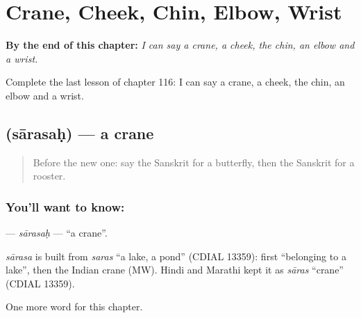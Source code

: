 
\chapter{Crane, Cheek, Chin, Elbow, Wrist}
\label{ch:sa-crane-cheek-chin-elbow-wrist}

\begin{chapteropening}
\textbf{By the end of this chapter:} \emph{I can say a crane, a cheek, the chin, an elbow and a wrist.}

Complete the last lesson of chapter 116: I can say a crane, a cheek, the chin, an elbow and a wrist.
\end{chapteropening}

\section[\texorpdfstring{\sk{सारसः} (sārasaḥ)}{सारसः (sārasaḥ)}]{ (sārasaḥ) — a crane}

\label{lesson:SA-C116-sarasah}



\begin{quote}
Before the new one: say the Sanskrit for a butterfly, then the Sanskrit for a rooster.
\end{quote}

\subsection*{You'll want to know: }
\textbf{} — \emph{sārasaḥ} — \textquotedblleft{}a crane\textquotedblright{}.

\begin{cousinweb}
\emph{sārasa} is built from \emph{saras} \textquotedblleft{}a lake, a pond\textquotedblright{} (CDIAL 13359): first \textquotedblleft{}belonging to a lake\textquotedblright{}, then the Indian crane (MW). Hindi and Marathi kept it as \emph{sāras} \textquotedblleft{}crane\textquotedblright{} (CDIAL 13359).
\end{cousinweb}

\begin{grammarlens}[title={What you've built}]
One more word for this chapter.
\end{grammarlens}

